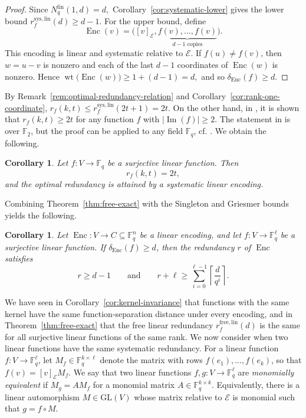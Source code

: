\documentclass[a4paper,12pt]{article}
\theoremstyle{plain}
\newtheorem{corollary}[lemma]{Corollary}
\theoremstyle{definition}
\newcommand{\F}{\mathbb F}
\newcommand{\wt}{\operatorname{wt}}
\newcommand{\Enc}{\operatorname{Enc}}
\newcommand{\Imf}{\operatorname{Im}}
\newcommand{\Nlin}{N_q^{\mathrm{lin}}}
\begin{document}
\begin{proof}
Since $\Nlin(1,d)=d,$
Corollary~\ref{cor:systematic-lower} gives the lower bound
$r_f^{\mathrm{sys,lin}}(d)\geq d-1$.
For the upper bound, define
\[
\Enc(v)
=
\bigl([v]_{\mathcal E},
\underbrace{f(v),\dots,f(v)}_{d-1\text{ copies}}\bigr).
\]
This encoding is linear and systematic relative to $\mathcal E$. If
$f(u)\neq f(v)$, then $w=u-v$ is nonzero and each of the last $d-1$
coordinates of $\Enc(w)$ is nonzero. 
Hence $ \wt\bigl(\Enc(w)\bigr)\geq 1+(d-1)=d, $
and so $\delta_{\Enc}(f)\geq d$.  
\end{proof}

By Remark~\ref{rem:optimal-redundancy-relation} and
Corollary~\ref{cor:rank-one-coordinate},
$r_f(k,t)\leq r_f^{\mathrm{sys,lin}}(2t+1)=2t$.
On the other hand, in \cite[Corollary 1]{lenz2023}, it is shown that $r_f(k,t)\geq 2t$ for any function $f$ with $| \Imf(f)| \ge2$. 
The statement in \cite{lenz2023} is over $\F_2$, but   the proof can be applied to any field $\F_q$, cf.
\cite{premlal2025}. We obtain the following.
\begin{corollary}
\label{cor:rank-one-fcc-optimal}
Let $f\colon V\to\F_q$ be a surjective linear function. Then
\[
r_f(k,t)=2t,
\]
and the optimal redundancy is attained by a systematic linear  encoding.
\end{corollary}
 
 
Combining Theorem~\ref{thm:free-exact} with the Singleton and
Griesmer bounds yields the following.
\begin{corollary} 
\label{cor:free-bounds}
Let $\Enc\colon V\to C\subseteq\F_q^n$ be a linear encoding, and let
$f\colon V\to\F_q^\ell$ be a surjective linear function. If
$\delta_{\Enc}(f)\geq d$, then the redundancy $r$ of $\Enc$
satisfies
\[
r\geq d-1
\qquad\text{and}\qquad
r+\ell
\geq
\sum_{i=0}^{\ell-1}
\left\lceil\frac{d}{q^i}\right\rceil.
\]
\end{corollary}
 

We have seen in Corollary~\ref{cor:kernel-invariance} that
functions with the same kernel have the same function-separation
distance under every encoding, and in
Theorem~\ref{thm:free-exact} that the free linear redundancy
$r_f^{\mathrm{free,lin}}(d)$ is the same for all surjective linear
functions of the same rank. 
We now consider when two linear
functions have the same systematic redundancy. 
For a linear function $f\colon V\to\F_q^\ell$, let
$M_f\in\F_q^{k\times\ell}$ denote the matrix with rows
$f(e_1),\dots,f(e_k)$, so that $f(v)=[v]_{\mathcal E}M_f$.
We say that two linear functions  $f,g: V \rightarrow \F_q^\ell$ are
\emph{monomially equivalent} if $M_g=AM_f$ for a monomial matrix
$A\in\F_q^{k\times k}$. Equivalently,    there is a linear automorphism $M\in\mathrm{GL}(V)$ whose matrix relative to
$\mathcal E$ is monomial such that $ g=f\circ M.$ 
\end{document}
